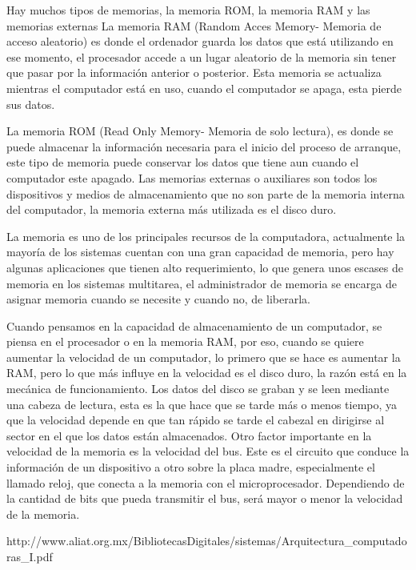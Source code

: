 \documentclass{article}
\begin{document}
\vspace{0.5cm}

Hay muchos tipos de memorias, la memoria ROM, la memoria RAM y las memorias externas 
La memoria RAM (Random Acces Memory- Memoria de acceso aleatorio) es donde el ordenador guarda los datos que está utilizando en ese momento, el procesador accede a un lugar aleatorio de la memoria sin tener que pasar por la información anterior o posterior. Esta memoria se actualiza mientras el computador está en uso, cuando el computador se apaga, esta pierde sus datos.

\vspace{0.5cm}

La memoria ROM (Read Only Memory- Memoria de solo lectura), es donde se puede almacenar la información necesaria para el inicio del proceso de arranque, este tipo de memoria puede conservar los datos que tiene aun cuando el computador este apagado.
Las memorias externas o auxiliares son todos los dispositivos y medios de almacenamiento que no son parte de la memoria interna del computador, la memoria externa más utilizada es el disco duro.

\vspace{0.5cm}

La memoria es uno de los principales recursos de la computadora, actualmente la mayoría de los sistemas cuentan con una gran capacidad de memoria, pero hay algunas aplicaciones que tienen alto requerimiento, lo que genera unos escases de memoria en los sistemas multitarea, el administrador de memoria se encarga de asignar memoria cuando se necesite y cuando no, de liberarla.

\vspace{2.5cm}
Cuando pensamos en la capacidad de almacenamiento de un computador, se piensa en el procesador o en la memoria RAM, por eso, cuando se quiere aumentar la velocidad de un computador, lo primero que se hace es aumentar la RAM, pero lo que más influye en la velocidad es el disco duro, la razón está en la mecánica de funcionamiento.
Los datos del disco se graban y se leen mediante una cabeza de lectura, esta es la que hace que se tarde más o menos tiempo, ya que la velocidad depende en que tan rápido se tarde el cabezal en dirigirse al sector en el que los datos están almacenados.
Otro factor importante en la velocidad de la memoria es la velocidad del bus. Este es el circuito que conduce la información de un dispositivo a otro sobre la placa madre, especialmente el llamado reloj, que conecta a la memoria con el microprocesador. Dependiendo de la cantidad de bits que pueda transmitir el bus, será mayor o menor la velocidad de la memoria.

\vspace{2cm}

\cite{Vasquez}


http://www.aliat.org.mx/BibliotecasDigitales/sistemas/Arquitectura_computadoras_I.pdf
\end{document}
